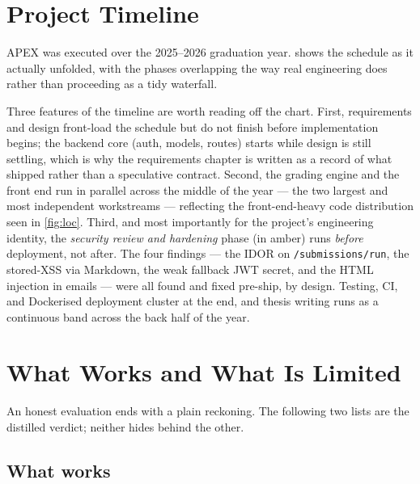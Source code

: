 \section{Project Timeline}
\label{sec:res-timeline}

APEX was executed over the 2025--2026 graduation year.  shows the
schedule as it actually unfolded, with the phases overlapping the way real
engineering does rather than proceeding as a tidy waterfall.



Three features of the timeline are worth reading off the chart. First, requirements
and design front-load the schedule but do not finish before implementation begins;
the backend core (auth, models, routes) starts while design is still settling, which
is why the requirements chapter is written as a record of what shipped rather than a
speculative contract. Second, the grading engine and the front end run in parallel
across the middle of the year --- the two largest and most independent workstreams ---
reflecting the front-end-heavy code distribution seen in \cref{fig:loc}. Third, and
most importantly for the project's engineering identity, the \emph{security review and
hardening} phase (in amber) runs \emph{before} deployment, not after. The four
findings --- the IDOR on \texttt{/submissions/run}, the stored-XSS via Markdown, the
weak fallback JWT secret, and the HTML injection in emails --- were all found and
fixed pre-ship, by design. Testing, CI, and Dockerised deployment cluster at the end,
and thesis writing runs as a continuous band across the back half of the year.

\section{What Works and What Is Limited}
\label{sec:res-verdict}

An honest evaluation ends with a plain reckoning. The following two lists are the
distilled verdict; neither hides behind the other.

\subsection*{What works}

